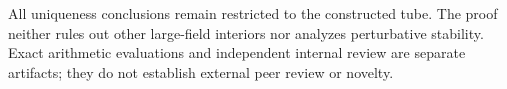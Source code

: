\documentclass[11pt]{article}
\begin{document}
All uniqueness conclusions remain restricted to the constructed tube. The
proof neither rules out other large-field interiors nor analyzes perturbative
stability. Exact arithmetic evaluations and independent internal review are
separate artifacts; they do not establish external peer review or novelty.
\end{document}
